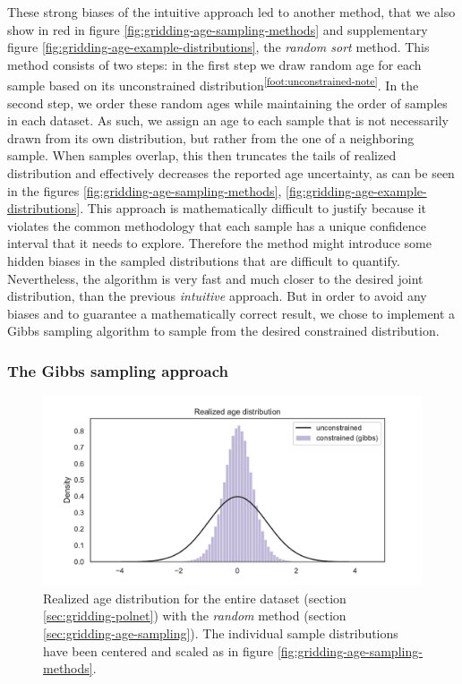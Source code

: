 \begin{refsection}
These strong biases of the intuitive approach led to another method, that we also show in red in figure \ref{fig:gridding-age-sampling-methods} and supplementary figure \ref{fig:gridding-age-example-distributions}, the \textit{random sort} method. This method consists of two steps: in the first step we draw random age for each sample based on its unconstrained distribution\textsuperscript{\ref{foot:unconstrained-note}}. In the second step, we order these random ages while maintaining the order of samples in each dataset. As such, we assign an age to each sample that is not necessarily drawn from its own distribution, but rather from the one of a neighboring sample. When samples overlap, this then truncates the tails of realized distribution and effectively decreases the reported age uncertainty, as can be seen in the figures \ref{fig:gridding-age-sampling-methods}, \ref{fig:gridding-age-example-distributions}. This approach is mathematically difficult to justify because it violates the common methodology that each sample has a unique confidence interval that it needs to explore. Therefore the method might introduce some hidden biases in the sampled distributions that are difficult to quantify. Nevertheless, the algorithm is very fast and much closer to the desired joint distribution, than the previous \textit{intuitive} approach. But in order to avoid any biases and to guarantee a mathematically correct result, we chose to implement a Gibbs sampling algorithm to sample from the desired constrained distribution.


\subsubsection{The Gibbs sampling approach}

\begin{figure}
	\includegraphics[width=\linewidth]{gridding-figures/full-realized-age-distribution.pdf}
	\caption[Realized age distribution for the entire dataset]{Realized age distribution for the entire dataset (section \ref{sec:gridding-polnet}) with the \textit{random} method (section \ref{sec:gridding-age-sampling}). The individual sample distributions have been centered and scaled as in figure \ref{fig:gridding-age-sampling-methods}.}
	\label{fig:gridding-full-age-distribution}
\end{figure}


\end{refsection}

